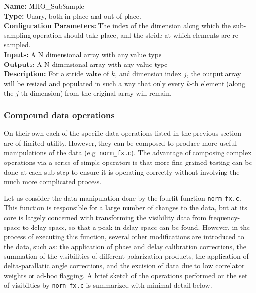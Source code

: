 \noindent \textbf{Name:} MHO\_SubSample  \\
\textbf{Type:} Unary, both in-place and out-of-place. \\
\textbf{Configuration Parameters:} The index of the dimension along which the sub-sampling operation should take place, and the stride at which elements are re-sampled.\\
\textbf{Inputs:} A N dimensional array with any value type\\
\textbf{Outputs:} A N dimensional array with any value type\\
\textbf{Description:} For a stride value of $k$, and dimension index $j$, the output array will be resized and populated in such a way that only every $k$-th element (along the $j$-th dimension) from the original array will remain.\\

\subsubsection{Compound data operations}

On their own each of the specific data operations listed in the previous section are of limited utility. However, they can be composed to produce more useful manipulations of the data (e.g. \texttt{norm\_fx.c}). The advantage of composing complex operations via a series of simple operators is that more fine grained testing can be done at each sub-step to ensure it is operating correctly without involving the much more complicated process.

Let us consider the data manipulation done by the fourfit function \texttt{norm\_fx.c}. This function is responsible for a large number of changes to the data, but at its core is largely concerned with transforming the visibility data from frequency-space to delay-space, so that a peak in delay-space can be found. However, in the process of executing this function, several other modifications are introduced to the data, such as: the application of phase and delay calibration corrections, the summation of the visibilities of different polarization-products, the application of delta-parallatic angle corrections, and the excision of data due to low correlator weights or ad-hoc flagging. A brief sketch of the operations performed on the set of visibilties by \texttt{norm\_fx.c} is summarized with minimal detail below.


